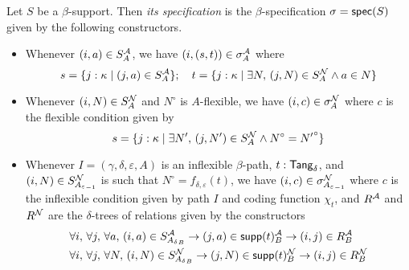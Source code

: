 \begin{definition}
  Let \( S \) be a \( \beta \)-support.
  Then \emph{its specification} is the \( \beta \)-specification \( \sigma = \operatorname{\mathsf{spec}}(S) \) given by the following constructors.
  \begin{itemize}
    \item Whenever \( (i, a) \in S_A^{\mathcal A} \), we have \( (i, (s, t)) \in \sigma_A^{\mathcal A} \) where
    \[ s = \{ j : \kappa \mid (j, a) \in S_A^{\mathcal A} \};\quad t = \{ j : \kappa \mid \exists N,\, (j, N) \in S_A^{\mathcal N} \wedge a \in N \} \]
    \item Whenever \( (i, N) \in S_A^{\mathcal N} \) and \( N^\circ \) is \( A \)-flexible, we have \( (i, c) \in \sigma_A^{\mathcal N} \) where \( c \) is the flexible condition given by
    \[ s = \{ j : \kappa \mid \exists N',\, (j, N') \in S_A^{\mathcal N} \wedge N^\circ = {N'}^\circ \} \]
    \item Whenever \( I = (\gamma,\delta,\varepsilon,A) \) is an inflexible \( \beta \)-path, \( t : \mathsf{Tang}_\delta \), and \( (i, N) \in S_{{A_\varepsilon}_{-1}}^{\mathcal N} \) is such that \( N^\circ = f_{\delta,\varepsilon}(t) \), we have \( (i, c) \in \sigma_{{A_\varepsilon}_{-1}}^{\mathcal N} \) where \( c \) is the inflexible condition given by path \( I \) and coding function \( \chi_t \), and \( R^{\mathcal A} \) and \( R^{\mathcal N} \) are the \( \delta \)-trees of relations given by the constructors
    \begin{align*}
      &\forall i,\, \forall j,\, \forall a,\, (i, a) \in S_{{A_\delta}_B}^{\mathcal A} \to (j, a) \in \operatorname{\mathsf{supp}}(t)_B^{\mathcal A} \to (i, j) \in R_B^{\mathcal A} \\
      &\forall i,\, \forall j,\, \forall N,\, (i, N) \in S_{{A_\delta}_B}^{\mathcal N} \to (j, N) \in \operatorname{\mathsf{supp}}(t)_B^{\mathcal N} \to (i, j) \in R_B^{\mathcal N}
    \end{align*}
  \end{itemize}
\end{definition}
